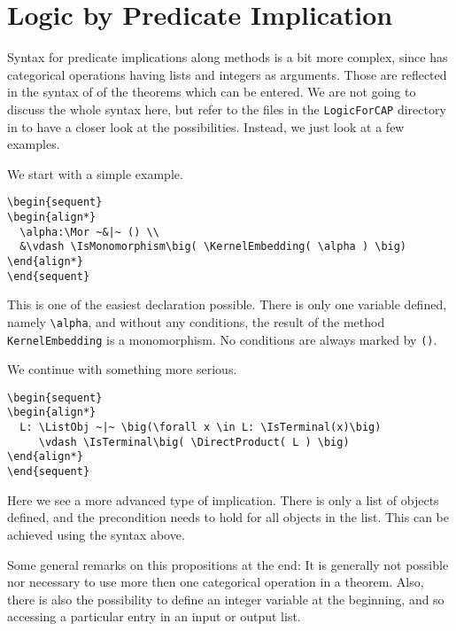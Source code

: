\section{Logic by Predicate Implication} \label{Section:LogicTwo}

Syntax for predicate implications along methods is a bit more complex, since \CapPkg has categorical operations
having lists and integers as arguments. Those are reflected in the syntax of of the theorems which can be entered. We are
not going to discuss the whole syntax here, but refer to the files in the \texttt{LogicForCAP} directory in \CapPkg to have
a closer look at the possibilities. Instead, we just look at a few examples.

\begin{example}
We start with a simple example.
\begin{Verbatim}[frame=single]
\begin{sequent}
\begin{align*}
  \alpha:\Mor ~&|~ () \\
  &\vdash \IsMonomorphism\big( \KernelEmbedding( \alpha ) \big)
\end{align*}
\end{sequent}
\end{Verbatim}

This is one of the easiest declaration possible. There is only one variable defined, namely \texttt{\textbackslash alpha}, and without any conditions,
the result of the method \texttt{KernelEmbedding} is a monomorphism. No conditions are always marked by \texttt{()}. 
\end{example}

\begin{example}
We continue with something more serious.
\begin{small}
\begin{Verbatim}[frame=single]
\begin{sequent}
\begin{align*}
  L: \ListObj ~|~ \big(\forall x \in L: \IsTerminal(x)\big)
     \vdash \IsTerminal\big( \DirectProduct( L ) \big)
\end{align*}
\end{sequent}
\end{Verbatim}
\end{small}
Here we see a more advanced type of implication. There is only a list of objects defined, and the precondition needs to hold
for all objects in the list. This can be achieved using the syntax above.
\end{example}

Some general remarks on this propositions at the end: It is generally not possible nor necessary to use more then one
categorical operation in a theorem. Also, there is also the possibility to define an integer variable at the beginning, and
so accessing a particular entry in an input or output list.




